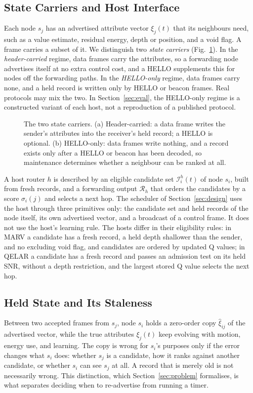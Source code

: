 \subsection{State Carriers and Host Interface}
\label{sec:carriers}
Each node $s_j$ has an advertised attribute vector $\xi_j(t)$ that its neighbours need, such as a value estimate, residual energy, depth or position, and a void flag. A frame carries a subset of it. We distinguish two \emph{state carriers} (Fig.~\ref{fig:carriers}). In the \emph{header-carried} regime, data frames carry the attributes, so a forwarding node advertises itself at no extra control cost, and a HELLO supplements this for nodes off the forwarding paths. In the \emph{HELLO-only} regime, data frames carry none, and a held record is written only by HELLO or beacon frames. Real protocols may mix the two. In Section~\ref{sec:eval}, the HELLO-only regime is a constructed variant of each host, not a reproduction of a published protocol.

\begin{figure}[t]
\centering

\caption{The two state carriers. (a) Header-carried: a data frame writes the sender's attributes into the receiver's held record; a HELLO is optional. (b) HELLO-only: data frames write nothing, and a record exists only after a HELLO or beacon has been decoded, so maintenance determines whether a neighbour can be ranked at all.}
\label{fig:carriers}
\end{figure}

A host router $h$ is described by an eligible candidate set $\mathcal{I}^h_i(t)$ of node $s_i$, built from fresh records, and a forwarding output $\mathcal{R}_h$ that orders the candidates by a score $\sigma_i(j)$ and selects a next hop. The scheduler of Section~\ref{sec:design} uses the host through three primitives only: the candidate set and held records of the node itself, its own advertised vector, and a broadcast of a control frame. It does not use the host's learning rule. The hosts differ in their eligibility rules: in MARV a candidate has a fresh record, a held depth shallower than the sender, and no excluding void flag, and candidates are ordered by updated Q values; in QELAR a candidate has a fresh record and passes an admission test on its held SNR, without a depth restriction, and the largest stored Q value selects the next hop.

\subsection{Held State and Its Staleness}
\label{sec:stale}
Between two accepted frames from $s_j$, node $s_i$ holds a zero-order copy $\hat{\xi}_{ij}$ of the advertised vector, while the true attributes $\xi_j(t)$ keep evolving with motion, energy use, and learning. The copy is wrong for $s_i$'s purposes only if the error changes what $s_i$ does: whether $s_j$ is a candidate, how it ranks against another candidate, or whether $s_i$ can see $s_j$ at all. A record that is merely old is not necessarily wrong. This distinction, which Section~\ref{sec:problem} formalises, is what separates deciding when to re-advertise from running a timer.

